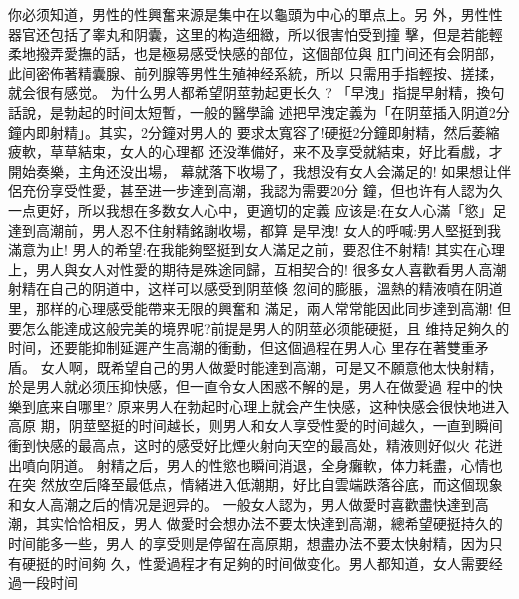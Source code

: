 \documentclass[12pt,UTF8]{ctexbook}
\begin{document}
你必须知道，男性的性興奮来源是集中在以龜頭为中心的單点上。另
外，男性性器官还包括了睾丸和阴囊，这里的构造细緻，所以很害怕受到撞
擊，但是若能輕柔地撥弄愛撫的話，也是極易感受快感的部位，这個部位與
肛门间还有会阴部，此间密佈著精囊腺、前列腺等男性生殖神经系統，所以
只需用手指輕按、搓揉，就会很有感觉。
为什么男人都希望阴莖勃起更长久 ?
「早洩」指提早射精，換句話說，是勃起的时间太短暫，一般的醫學論
述把早洩定義为「在阴莖插入阴道2分鐘内即射精」。其实，2分鐘对男人的
要求太寬容了!硬挺2分鐘即射精，然后萎縮疲軟，草草結束，女人的心理都
还没準備好，来不及享受就結束，好比看戲，才開始奏樂，主角还没出場，
幕就落下收場了，我想没有女人会滿足的!
如果想让伴侶充份享受性愛，甚至进一步達到高潮，我認为需要20分
鐘，但也许有人認为久一点更好，所以我想在多数女人心中，更適切的定義
应该是:在女人心滿「慾」足達到高潮前，男人忍不住射精銘謝收場，都算
是早洩!
女人的呼喊:男人堅挺到我滿意为止!
男人的希望:在我能夠堅挺到女人滿足之前，要忍住不射精!
其实在心理上，男人與女人对性愛的期待是殊途同歸，互相契合的!
很多女人喜歡看男人高潮射精在自己的阴道中，这样可以感受到阴莖倏
忽间的膨脹，溫熱的精液噴在阴道里，那样的心理感受能帶来无限的興奮和
滿足，兩人常常能因此同步達到高潮!
但要怎么能達成这般完美的境界呢?前提是男人的阴莖必须能硬挺，且
维持足夠久的时间，还要能抑制延遲产生高潮的衝動，但这個過程在男人心
里存在著雙重矛盾。
女人啊，既希望自己的男人做愛时能達到高潮，可是又不願意他太快射精，於是男人就必须压抑快感，但一直令女人困惑不解的是，男人在做愛過
程中的快樂到底来自哪里?
原来男人在勃起时心理上就会产生快感，这种快感会很快地进入高原
期，阴莖堅挺的时间越长，则男人和女人享受性愛的时间越久，一直到瞬间
衝到快感的最高点，这时的感受好比煙火射向天空的最高处，精液则好似火
花迸出噴向阴道。
射精之后，男人的性慾也瞬间消退，全身癱軟，体力耗盡，心情也在突
然放空后降至最低点，情緒进入低潮期，好比自雲端跌落谷底，而这個现象
和女人高潮之后的情况是迥异的。
一般女人認为，男人做愛时喜歡盡快達到高潮，其实恰恰相反，男人
做愛时会想办法不要太快達到高潮，總希望硬挺持久的时间能多一些，男人
的享受则是停留在高原期，想盡办法不要太快射精，因为只有硬挺的时间夠
久，性愛過程才有足夠的时间做变化。男人都知道，女人需要经過一段时间
\end{document}
